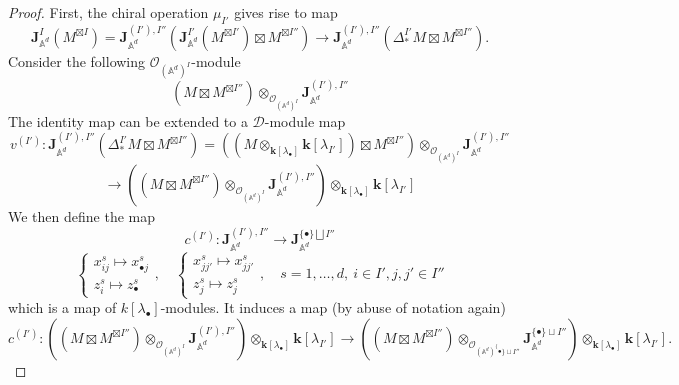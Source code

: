 \documentclass[11pt]{amsart}
\theoremstyle{definition}
\theoremstyle{remark}
\numberwithin{equation}{section}
\begin{document}
\begin{proof}
First, the chiral operation $\mu_{I'}$ gives rise to map
\[
\mathbf{J}_{\mathbb{A}^d}^{{I}}(M^{\boxtimes{I}})=\mathbf{J}_{\mathbb{A}^d}^{(I'),{I''}}(\mathbf{J}_{\mathbb{A}^d}^{{I'}}(M^{\boxtimes{I'}})\boxtimes M^{\boxtimes {I''}})\rightarrow\mathbf{J}^{({I'}),{{I''}}}_{\mathbb{A}^d}(\Delta^{I'}_*M\boxtimes M^{\boxtimes{I''}}).
\]
Consider the following $\mathcal{O}_{(\mathbb{A}^d)^I}$-module
$$
\left(M\boxtimes M^{\boxtimes I''}\right)\otimes_{\mathcal{O}_{(\mathbb{A}^d)^I}}\mathbf{J}_{\mathbb{A}^d}^{({I'}),{{I''}}}
$$
The identity map can be extended to a $\mathcal{D}$-module map
$$
v^{(I')}:\mathbf{J}^{({I'}),{{I''}}}_{\mathbb{A}^d}(\Delta^{I'}_*M\boxtimes M^{\boxtimes{I''}})=\left((M\otimes_{\mathbf{k}[\lambda_{\bullet}]}\mathbf{k}[\lambda_{I'}])\boxtimes M^{\boxtimes I''}\right)\otimes_{\mathcal{O}_{(\mathbb{A}^d)^I}}\mathbf{J}_{\mathbb{A}^d}^{({I'}),{{I''}}}
$$
\[
\rightarrow \left(\left(M\boxtimes M^{\boxtimes I''}\right)\otimes_{\mathcal{O}_{(\mathbb{A}^d)^I}}\mathbf{J}_{\mathbb{A}^d}^{({I'}),{{I''}}}\right)\otimes_{\mathbf{k}[\lambda_{\bullet}]}\mathbf{k}[\lambda_{I'}]
\]
We then define the map
$$
c^{(I')}:\mathbf{J}_{\mathbb{A}^d}^{({I'}),{{I''}}}\rightarrow \mathbf{J}_{\mathbb{A}^d}^{\{\bullet\}\bigsqcup {I''}}
$$
$$
\begin{cases}
  x^s_{ij}\mapsto x^s_{\bullet j}\\
  z^s_i\mapsto z^s_{\bullet}
\end{cases}, \quad\begin{cases}x^s_{jj'}\mapsto x^s_{jj'}\\
 z^s_j\mapsto z^s_{j}
                    \end{cases}, \quad s=1,\dots,d, \ i\in {I'}, j,j'\in {I''}
$$
which is a map of $k[\lambda_{\bullet}]$-modules. It induces a map (by abuse of notation again)
$$
c^{(I')}:\left(\left(M\boxtimes M^{\boxtimes I''}\right)\otimes_{\mathcal{O}_{(\mathbb{A}^d)^I}}\mathbf{J}_{\mathbb{A}^d}^{({I'}),{{I''}}}\right)\otimes_{\mathbf{k}[\lambda_{\bullet}]}\mathbf{k}[\lambda_{I'}]\rightarrow \left(\left(M\boxtimes M^{\boxtimes I''}\right)\otimes_{\mathcal{O}_{(\mathbb{A}^d)^\{\bullet\}\sqcup I''}}\mathbf{J}_{\mathbb{A}^d}^{\{\bullet\}\sqcup I''}\right)\otimes_{\mathbf{k}[\lambda_{\bullet}]}\mathbf{k}[\lambda_{I'}].
$$


\end{proof}
\end{document}
